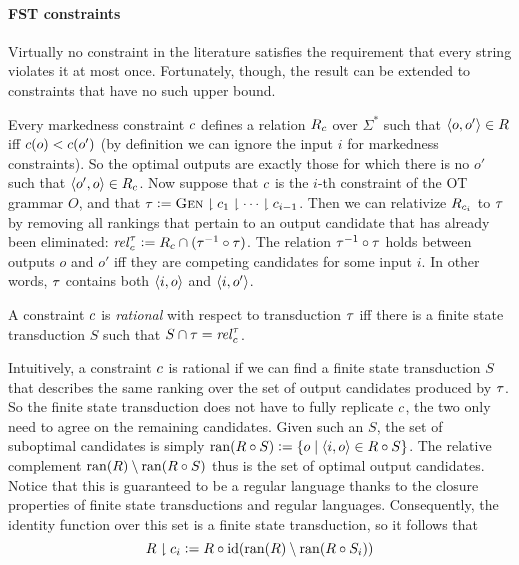 \paragraph{FST constraints}
Virtually no constraint in the literature satisfies the requirement that every string violates it at most once.
Fortunately, though, the result can be extended to constraints that have no such upper bound.

Every markedness constraint $c$ defines a relation $R_{c}$ over $\Sigma^*$ such that $\left \langle o,o' \right \rangle  \in R$ iff $c(o) < c(o')$ (by definition we can ignore the input $i$ for markedness constraints).
So the optimal outputs are exactly those for which there is no $o'$ such that $\left \langle o',o \right \rangle  \in R_{c}$.
Now suppose that $c$ is the $i$-th constraint of the OT grammar $O$, and that $\tau \mathrel{\mathop:}= \textsc{Gen} \downharpoonright c_1 \downharpoonright \cdots \downharpoonright c_{i-1}$.
Then we can relativize $R_{c_i}$ to $\tau$ by removing all rankings that pertain to an output candidate that has already been eliminated: $\mathit{rel}^{\tau}_{c} \mathrel{\mathop:}= R_{c} \cap (\tau^{-1} \circ \tau)$.
The relation $\tau^{-1} \circ \tau$ holds between outputs $o$ and $o'$ iff they are competing candidates for some input $i$.
In other words, $\tau$ contains both $\left \langle i,o \right \rangle $ and $\left \langle i,o' \right \rangle $.
%
\begin{definition}
    A constraint $c$ is \emph{rational} with respect to transduction $\tau$ iff there is a finite state transduction $S$ such that $S \cap \tau = \mathit{rel}^{\tau}_{c}$.
\end{definition}
%
Intuitively, a constraint $c$ is rational if we can find a finite state transduction $S$ that describes the same ranking over the set of output candidates produced by $\tau$.
So the finite state transduction does not have to fully replicate $c$, the two only need to agree on the remaining candidates.
Given such an $S$, the set of suboptimal candidates is simply $\mathop{\mathrm{ran}}(R \circ S) \mathrel{\mathop:}= \left \{  o \mid \left \langle i,o \right \rangle  \in R \circ S \right \}$.
The relative complement $\mathop{\mathrm{ran}}(R) \setminus \mathop{\mathrm{ran}}(R \circ S)$ thus is the set of optimal output candidates.
Notice that this is guaranteed to be a regular language thanks to the closure properties of finite state transductions and regular languages.
Consequently, the identity function over this set is a finite state transduction, so it follows that
%
\[
    R \downharpoonright c_i \mathrel{\mathop:}=
        R \circ \mathrm{id}(\mathop{\mathrm{ran}}(R) \setminus \mathop{\mathrm{ran}}(R \circ S_i))
\]
